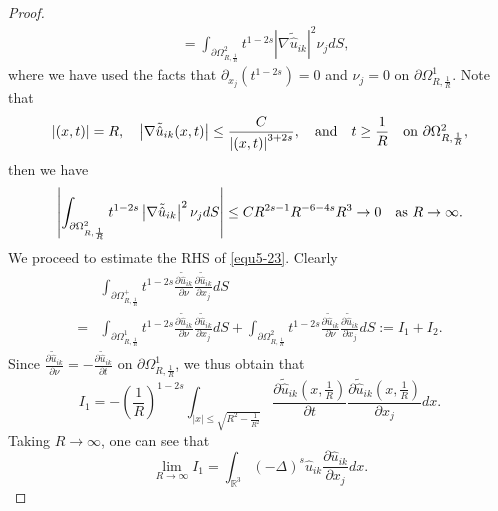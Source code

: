 \documentclass[reqno, 11pt]{amsart} %
\numberwithin{equation}{section}
\begin{document}
\begin{proof}
\begin{equation}
\begin{split}
				&=\int_{\partial\Omega_{R, \frac{1}{R}}^{2}}t^{1-2s}\left|\nabla\tilde{\hat{u}}_{ik} \right| ^{2}\nu_{j}dS,
			\end{split}
		\end{equation}
		where we have used the facts that $\partial_{x_{j}}(t^{1-2s})=0$
		and $\nu_{j}=0$ on $\partial\Omega_{R, \frac{1}{R}}^{1}$. Note that
		\begin{equation*}
			\left|(x, t)\right|=R,\quad \left| \nabla\tilde{\hat{u}}_{ik}(x, t)\right|\leq\frac{C}{\left|(x, t)\right|^{3+2s}},  \quad  \hbox{and}\quad t\geq\frac{1}{R}\quad \hbox{on $\partial\Omega_{R, \frac{1}{R}}^{2}$},
		\end{equation*}
		then we have
		\begin{equation}\label{equ5-25}
			\left| \int_{\partial\Omega_{R, \frac{1}{R}}^{2}}t^{1-2s}\left|\nabla\tilde{\hat{u}}_{ik} \right| ^{2}\nu_{j}dS\right| \leq CR^{2s-1}R^{-6-4s}R^{3}\rightarrow0\quad \hbox{as $R\rightarrow\infty$}.
		\end{equation}	
		We proceed to estimate the RHS of \eqref{equ5-23}. Clearly
		\begin{equation}\label{equ5-26}
			\begin{split}
				&	\int_{\partial\Omega_{R, \frac{1}{R}}^{+}}t^{1-2s}\frac{\partial \tilde{\hat{u}}_{ik}}{\partial\nu}\frac{\partial \tilde{\hat{u}}_{ik}}{\partial x_{j}}dS\\
				=&\int_{\partial\Omega_{R, \frac{1}{R}}^{1}}t^{1-2s}\frac{\partial \tilde{\hat{u}}_{ik}}{\partial\nu}\frac{\partial \tilde{\hat{u}}_{ik}}{\partial x_{j}}dS+\int_{\partial\Omega_{R, \frac{1}{R}}^{2}}t^{1-2s}\frac{\partial \tilde{\hat{u}}_{ik}}{\partial\nu}\frac{\partial \tilde{\hat{u}}_{ik}}{\partial x_{j}}dS:=I_{1}+I_{2}.
			\end{split}
		\end{equation}
		Since $\frac{\partial \tilde{\hat{u}}_{ik}}{\partial\nu}=-\frac{\partial \tilde{\hat{u}}_{ik}}{\partial t}$ on $\partial\Omega_{R, \frac{1}{R}}^{1}$, we thus obtain that
		\begin{equation*}
			I_{1}=-\left( \frac{1}{R}\right)^{1-2s}\int_{|x|\leq\sqrt{R^{2}-\frac{1}{R^{2}}}}\frac{\partial \tilde{\hat{u}}_{ik}\left( x, \frac{1}{R}\right) }{\partial t}\frac{\partial \tilde{\hat{u}}_{ik}\left( x, \frac{1}{R}\right) }{\partial x_{j}}dx.
		\end{equation*}	
		Taking $R\rightarrow\infty$, one can see that
		\begin{equation}\label{equ5-27}
			\lim_{R\rightarrow\infty}I_{1}=	\int_{\mathbb{R}^{3}}(-\Delta)^{s} \hat{u}_{ik}\frac{\partial\hat{u}_{ik}}{\partial x_{j}}dx.

\end{equation}
\end{proof}
\end{document}
